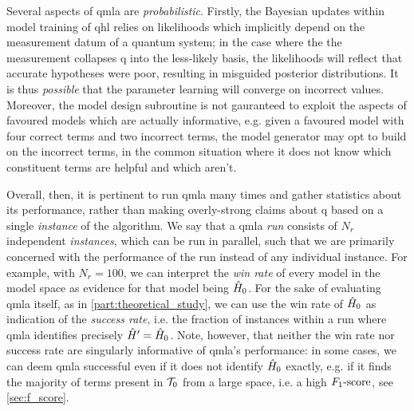 Several aspects of \gls{qmla} are \emph{probabilistic}.
Firstly, the Bayesian updates within model training of \gls{qhl} relies on \glspl{likelihood}  which 
    implicitly depend on the measurement datum of a quantum system; 
    in the case where the the measurement collapses \gls{q} into the less-likely basis, 
    the \glspl{likelihood}  will reflect that accurate hypotheses were poor, 
    resulting in misguided posterior distributions. 
It is thus \emph{possible} that the parameter learning will converge on incorrect values. 
Moreover, the model design subroutine is not gauranteed to exploit the aspects of favoured models which are 
    actually informative, e.g. given a favoured model with four correct terms and two incorrect terms, 
    the model generator may opt to build on the incorrect terms, in the common situation where it does not know 
    which constituent terms are helpful and which aren't. 
\par 
Overall, then, it is pertinent to run \gls{qmla} many times and gather statistics about its performance, 
    rather than making overly-strong claims about \gls{q} based on a single \emph{instance} of the algorithm. 
We say that a \gls{qmla} \emph{\gls{run}} consists of $N_r$ independent \emph{\glspl{instance}},
    which can be run in parallel, such that we are primarily concerned with the performance of the run 
    instead of any individual instance. 
For example, with $N_r=100$, we can interpret the \emph{ \gls{win rate} } of every model in the model space
    as evidence for that model being $\hat{H}_0$.
For the sake of evaluating \gls{qmla} itself, as in \cref{part:theoretical_study}, 
    we can use the  \gls{win rate}  of $\hat{H}_0$ as indication of the \emph{\gls{success rate}}, 
    i.e. the fraction of \glspl{instance} within a run where \gls{qmla} identifies precisely $\hat{H}^{\prime} = \hat{H}_0$. 
Note, however, that neither the  \gls{win rate}  nor \gls{success rate} are singularly informative 
    of \gls{qmla}'s performance: in some cases, we can deem \gls{qmla} successful even if it does not 
    identify $\hat{H}_0$ exactly, e.g. if it finds the majority of terms present in $\mathcal{T}_0$ from a large space, 
    i.e. a high $ F_{1}\text{-score} $, see \cref{sec:f_score}. 


